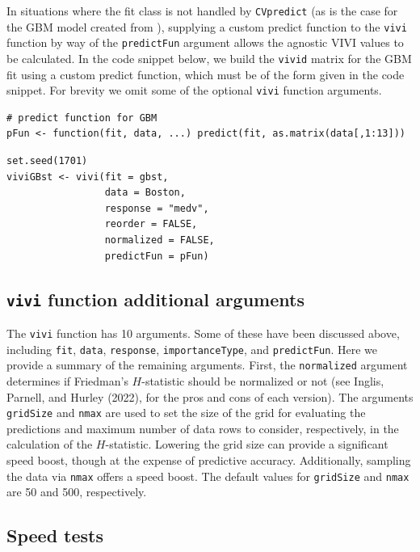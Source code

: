 In situations where the fit class is not handled by \texttt{CVpredict} (as is the case for the GBM model created from ), supplying a custom predict function to the \texttt{vivi} function by way of the \texttt{predictFun} argument allows the agnostic VIVI values to be calculated.
In the code snippet below, we build the \texttt{vivid} matrix for the GBM fit using a custom predict function, which must be of the form given in the code snippet.
For brevity we omit some of the optional \texttt{vivi} function arguments.

\begin{verbatim}
# predict function for GBM
pFun <- function(fit, data, ...) predict(fit, as.matrix(data[,1:13]))
\end{verbatim}

\begin{verbatim}
set.seed(1701) 
viviGBst <- vivi(fit = gbst,
                 data = Boston,
                 response = "medv",
                 reorder = FALSE,
                 normalized = FALSE,
                 predictFun = pFun)
\end{verbatim}

\hypertarget{sec:vivimatarg}{%
\subsection{\texorpdfstring{\texttt{vivi} function additional arguments}{vivi function additional arguments}}\label{sec:vivimatarg}}

The \texttt{vivi} function has 10 arguments. Some of these have been discussed above, including \texttt{fit}, \texttt{data}, \texttt{response}, \texttt{importanceType}, and \texttt{predictFun}. Here we provide a summary of the remaining arguments. First, the \texttt{normalized} argument determines if Friedman's \(H\)-statistic should be normalized or not (see Inglis, Parnell, and Hurley (2022), for the pros and cons of each version). The arguments \texttt{gridSize} and \texttt{nmax} are used to set the size of the grid for evaluating the predictions and maximum number of data rows to consider, respectively, in the calculation of the \(H\)-statistic. Lowering the grid size can provide a significant speed boost, though at the expense of predictive accuracy. Additionally, sampling the data via \texttt{nmax} offers a speed boost. The default values for \texttt{gridSize} and \texttt{nmax} are 50 and 500, respectively.

\hypertarget{sec:speed}{%
\subsection{Speed tests}\label{sec:speed}}

